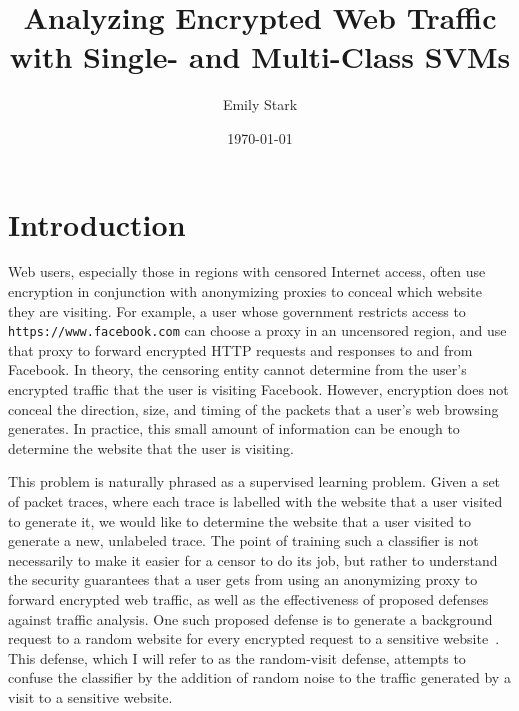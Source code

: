 \documentclass[10pt, twocolumn]{article}
\title{Analyzing Encrypted Web Traffic with Single- and Multi-Class SVMs}
\author{Emily Stark}
\date{\today}                                          %
\begin{document}
\maketitle


\section{Introduction}
Web users, especially those in regions with censored 
Internet access, often use encryption in conjunction 
with anonymizing proxies to conceal which website 
they are visiting. For example, a user whose government 
restricts access to \texttt{https://www.facebook.com} can choose a 
proxy in an uncensored region, and use that proxy to 
forward encrypted HTTP requests and responses to and 
from Facebook. In theory, the censoring entity cannot determine from 
the user's encrypted traffic that the user is visiting 
Facebook. However, encryption does not conceal the direction, 
size, and timing of the packets that a user's web browsing 
generates. In practice, this small amount of information can 
be enough to determine the website that the user is visiting.

This problem is naturally phrased as a supervised learning 
problem. Given a set of packet traces, where each trace is labelled 
with the website that a user visited to generate it, we would 
like to determine the website that a user visited to generate a new, 
unlabeled trace. The point of training such a classifier is not 
necessarily to make it easier for a censor to do its job, but rather 
to understand the security guarantees that a user gets from using 
an anonymizing proxy to forward encrypted web traffic, as well as 
the effectiveness of proposed defenses against traffic analysis. 
One such proposed defense is to generate a background request to a 
random website for every encrypted request to a sensitive website~\cite{torfingerprinting}. 
This defense, which I will refer to as the random-visit defense, 
attempts to confuse the classifier by the addition of random 
noise to the traffic generated by a visit to a sensitive website.
\end{document}

